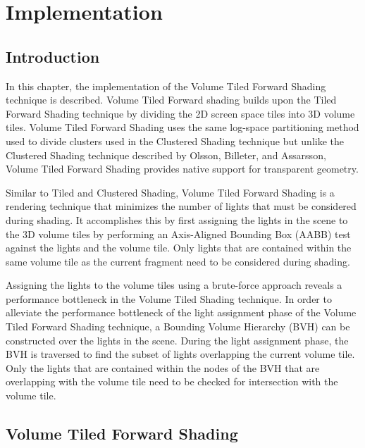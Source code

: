 
\chapter{Implementation} %
\label{ch:Implementation}

\section{Introduction}

In this chapter, the implementation of the Volume Tiled Forward Shading technique is described. Volume Tiled Forward shading builds upon the Tiled Forward Shading technique \parencite{13_olssonassarsson_2011} by dividing the 2D screen space tiles into 3D volume tiles. Volume Tiled Forward Shading uses the same log-space partitioning method used to divide clusters used in the Clustered Shading technique \parencite{20_olsson_2012} but unlike the Clustered Shading technique described by Olsson, Billeter, and Assarsson, Volume Tiled Forward Shading provides native support for transparent geometry.

Similar to Tiled and Clustered Shading, Volume Tiled Forward Shading is a rendering technique that minimizes the number of lights that must be considered during shading. It accomplishes this by first assigning the lights in the scene to the 3D volume tiles by performing an Axis-Aligned Bounding Box (AABB) test against the lights and the volume tile. Only lights that are contained within the same volume tile as the current fragment need to be considered during shading.

Assigning the lights to the volume tiles using a brute-force approach reveals a performance bottleneck in the Volume Tiled Shading technique. In order to alleviate the performance bottleneck of the light assignment phase of the Volume Tiled Forward Shading technique, a Bounding Volume Hierarchy (BVH) can be constructed over the lights in the scene. During the light assignment phase, the BVH is traversed to find the subset of lights overlapping the current volume tile. Only the lights that are contained within the nodes of the BVH that are overlapping with the volume tile need to be checked for intersection with the volume tile.

\section{Volume Tiled Forward Shading}
\label{sec:VolumeTiledForwardShading}

